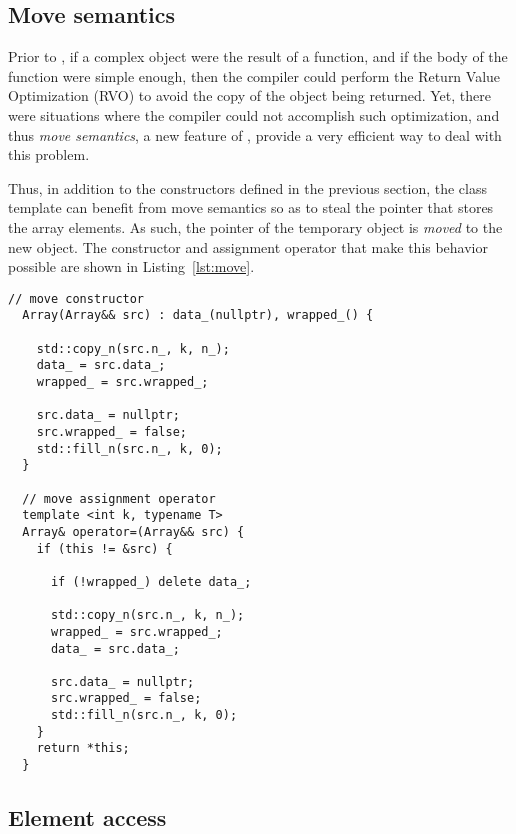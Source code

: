 \documentclass[11pt]{article}
\def\ifmonospace{\ifdim\fontdimen3\font=0pt }
\def\CPP11{\ifmonospace C++11\else C\kern-.1667em\raise.50ex\hbox{\tiny{\textbf{+}\kern-.1em\textbf{+}}}\kern-.1em11\fi \spacefactor1000 }
\newcommand{\code}[1]{{\footnotesize\ttfamily{#1}}}
\begin{document}
\subsection{Move semantics}

Prior to \CPP11, if a complex object were the result of a function, and if the body of the function were simple enough, then the compiler could perform the Return Value Optimization (RVO) to avoid the copy of the object being returned.
Yet, there were situations where the compiler could not accomplish such optimization, and thus \emph{move semantics}, a new feature of \CPP11, provide a very efficient way to deal with this problem.

Thus, in addition to the constructors defined in the previous section, the \code{Array} class template can benefit from move semantics so as to steal the \code{data\_} pointer that stores the array elements.
As such, the pointer of the temporary object is \emph{moved} to the new object.
The constructor and assignment operator that make this behavior possible are shown in Listing~\ref{lst:move}.
\begin{lstlisting}[caption={Move constructor and assignment operator}, label=lst:move]
  // move constructor
  Array(Array&& src) : data_(nullptr), wrapped_() {
    
    std::copy_n(src.n_, k, n_);
    data_ = src.data_;
    wrapped_ = src.wrapped_;
  
    src.data_ = nullptr;
    src.wrapped_ = false;
    std::fill_n(src.n_, k, 0);
  }
  
  // move assignment operator
  template <int k, typename T>
  Array& operator=(Array&& src) {  
    if (this != &src) {
      
      if (!wrapped_) delete data_;
    
      std::copy_n(src.n_, k, n_);
      wrapped_ = src.wrapped_;
      data_ = src.data_;
      
      src.data_ = nullptr;
      src.wrapped_ = false;
      std::fill_n(src.n_, k, 0);
    }
    return *this;
  }
\end{lstlisting}





\subsection{Element access}
\end{document}
